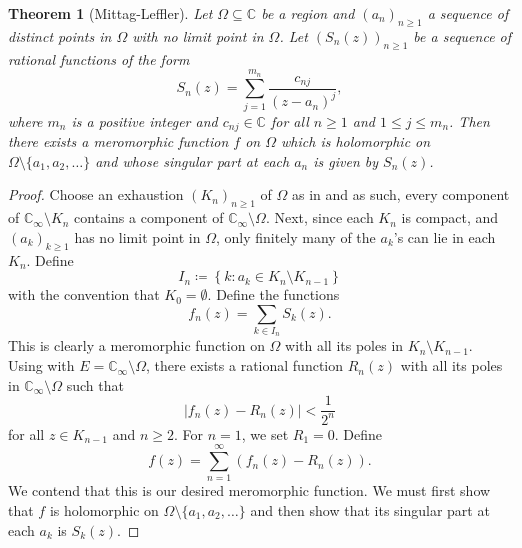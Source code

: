 \documentclass[11pt]{article}
\theoremstyle{thmstyle}
\newtheorem{theorem}{Theorem}[section]
\theoremstyle{defstyle}
\newcommand{\bbC}{\mathbb{C}}
\renewcommand{\le}{\leqslant}
\renewcommand{\ge}{\geqslant}
\begin{document}
\begin{theorem}[Mittag-Leffler]
    Let $\Omega\subseteq\bbC$ be a region and $(a_n)_{n\ge 1}$ a sequence of distinct points in $\Omega$ with no limit point in $\Omega$. Let $(S_n(z))_{n\ge 1}$ be a sequence of rational functions of the form 
    \begin{equation*}
        S_n(z) = \sum_{j = 1}^{m_n}\frac{c_{nj}}{(z - a_n)^j},
    \end{equation*}
    where $m_n$ is a positive integer and $c_{nj}\in\bbC$ for all $n\ge 1$ and $1\le j\le m_n$. Then there exists a meromorphic function $f$ on $\Omega$ which is holomorphic on $\Omega\setminus\{a_1,a_2,\dots\}$ and whose singular part at each $a_n$ is given by $S_n(z)$.
\end{theorem}
\begin{proof}
    Choose an exhaustion $(K_n)_{n\ge 1}$ of $\Omega$ as in  and as such, every component of $\bbC_\infty\setminus K_n$ contains a component of $\bbC_\infty\setminus\Omega$. Next, since each $K_n$ is compact, and $(a_k)_{k\ge 1}$ has no limit point in $\Omega$, only finitely many of the $a_k$'s can lie in each $K_n$. Define 
    \begin{equation*}
        I_n \coloneq\left\{k\colon a_k\in K_n\setminus K_{n - 1}\right\}
    \end{equation*}
    with the convention that $K_0 = \emptyset$. Define the functions 
    \begin{equation*}
        f_n(z) = \sum_{k\in I_n}S_k(z).
    \end{equation*}
    This is clearly a meromorphic function on $\Omega$ with all its poles in $K_n\setminus K_{n - 1}$. Using  with $E = \bbC_\infty\setminus\Omega$, there exists a rational function $R_n(z)$ with all its poles in $\bbC_\infty\setminus\Omega$ such that 
    \begin{equation*}
        |f_n(z) - R_n(z)| < \frac{1}{2^n}
    \end{equation*}
    for all $z\in K_{n - 1}$ and $n\ge 2$. For $n = 1$, we set $R_1 = 0$. Define 
    \begin{equation*}
        f(z) = \sum_{n = 1}^\infty \left(f_n(z) - R_n(z)\right).
    \end{equation*}
    We contend that this is our desired meromorphic function. We must first show that $f$ is holomorphic on $\Omega\setminus\{a_1,a_2,\dots\}$ and then show that its singular part at each $a_k$ is $S_k(z)$. 


\end{proof}
\end{document}
